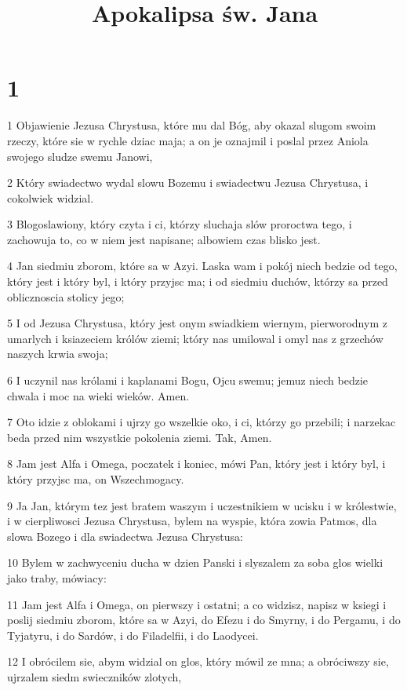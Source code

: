 

\title{Apokalipsa św. Jana}


\chapter{1}

\par 1 Objawienie Jezusa Chrystusa, które mu dal Bóg, aby okazal slugom swoim rzeczy, które sie w rychle dziac maja; a on je oznajmil i poslal przez Aniola swojego sludze swemu Janowi,
\par 2 Który swiadectwo wydal slowu Bozemu i swiadectwu Jezusa Chrystusa, i cokolwiek widzial.
\par 3 Blogoslawiony, który czyta i ci, którzy sluchaja slów proroctwa tego, i zachowuja to, co w niem jest napisane; albowiem czas blisko jest.
\par 4 Jan siedmiu zborom, które sa w Azyi. Laska wam i pokój niech bedzie od tego, który jest i który byl, i który przyjsc ma; i od siedmiu duchów, którzy sa przed oblicznoscia stolicy jego;
\par 5 I od Jezusa Chrystusa, który jest onym swiadkiem wiernym, pierworodnym z umarlych i ksiazeciem królów ziemi; który nas umilowal i omyl nas z grzechów naszych krwia swoja;
\par 6 I uczynil nas królami i kaplanami Bogu, Ojcu swemu; jemuz niech bedzie chwala i moc na wieki wieków. Amen.
\par 7 Oto idzie z oblokami i ujrzy go wszelkie oko, i ci, którzy go przebili; i narzekac beda przed nim wszystkie pokolenia ziemi. Tak, Amen.
\par 8 Jam jest Alfa i Omega, poczatek i koniec, mówi Pan, który jest i który byl, i który przyjsc ma, on Wszechmogacy.
\par 9 Ja Jan, którym tez jest bratem waszym i uczestnikiem w ucisku i w królestwie, i w cierpliwosci Jezusa Chrystusa, bylem na wyspie, która zowia Patmos, dla slowa Bozego i dla swiadectwa Jezusa Chrystusa:
\par 10 Bylem w zachwyceniu ducha w dzien Panski i slyszalem za soba glos wielki jako traby, mówiacy:
\par 11 Jam jest Alfa i Omega, on pierwszy i ostatni; a co widzisz, napisz w ksiegi i poslij siedmiu zborom, które sa w Azyi, do Efezu i do Smyrny, i do Pergamu, i do Tyjatyru, i do Sardów, i do Filadelfii, i do Laodycei.
\par 12 I obrócilem sie, abym widzial on glos, który mówil ze mna; a obróciwszy sie, ujrzalem siedm swieczników zlotych,
